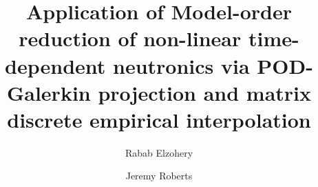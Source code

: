 \documentclass[review,number,sort&compress,12pt]{elsarticle}
\begin{document}
% 
\begin{frontmatter}


\title{Application of Model-order reduction of non-linear time-dependent neutronics via POD-Galerkin projection and matrix discrete empirical interpolation}
\author[focal]{Rabab Elzohery}
\author{Jeremy Roberts}
\address {The Alan Levin Department of Mechanical and Nuclear Engineering,
	Kansas State University \\
	3002 Rathbone Hall, Manhattan, KS 66506, US \\ rababelzohery@ksu.edu, jaroberts@ksu.edu}



\end{frontmatter}
\end{document}
